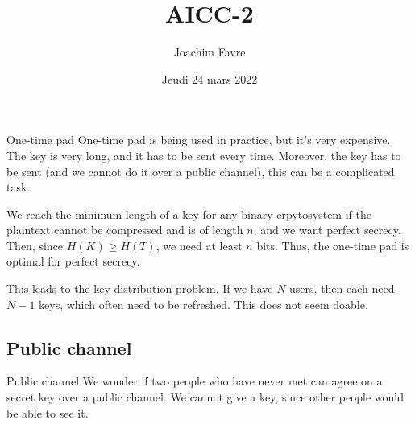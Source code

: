 \documentclass[a4paper]{article}
\title{AICC-2}
\author{Joachim Favre}
\date{Jeudi 24 mars 2022}
\begin{document}
\maketitle


\begin{parag}{One-time pad}
    One-time pad is being used in practice, but it's very expensive. The key is very long, and it has to be sent every time. Moreover, the key has to be sent (and we cannot do it over a public channel), this can be a complicated task.

    We reach the minimum length of a key for any binary crpytosystem if the plaintext cannot be compressed and is of length $n$, and we want perfect secrecy. Then, since $H\left(K\right) \geq H\left(T\right)$, we need at least $n$ bits. Thus, the one-time pad is optimal for perfect secrecy.

    This leads to the key distribution problem. If we have $N$ users, then each need $N - 1$ keys, which often need to be refreshed. This does not seem doable.
\end{parag}

\subsection{Public channel}
\begin{parag}{Public channel}
    We wonder if two people who have never met can agree on a secret key over a public channel. We cannot give a key, since other people would be able to see it.
\end{parag}
\end{document}
